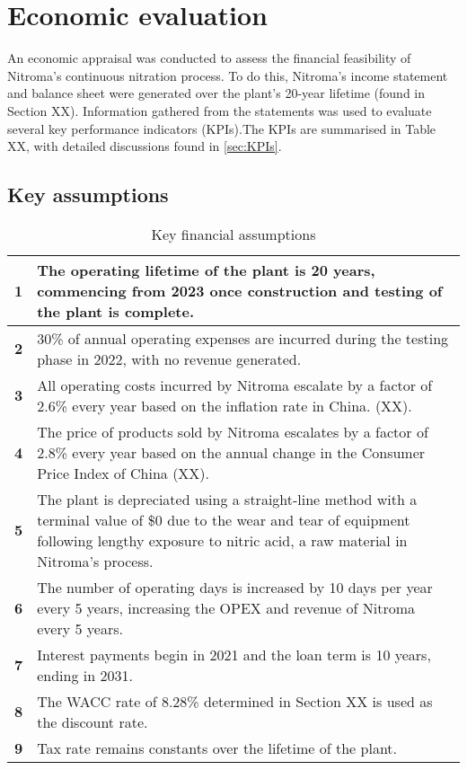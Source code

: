 \section{Economic evaluation}
An economic appraisal was conducted to assess the financial feasibility of Nitroma’s continuous nitration process. To do this, Nitroma’s income statement and balance sheet were generated over the plant’s 20-year lifetime (found in Section XX). Information gathered from the statements was used to evaluate several key performance indicators (KPIs).The KPIs are summarised in Table XX, with detailed discussions found in \cref{sec:KPIs}.

\subsection{Key assumptions}

 \begin{table}
    \vspace{-\intextsep}
    \centering
        \caption{Key financial assumptions}
        \label{tab:assumption}
    \begin{tabular}{@{}lp{15cm}@{}}
    \toprule
   \textbf{1} & The operating lifetime of the plant is 20 years, commencing from 2023 once construction and testing of the plant is complete.   \\ \midrule
   \textbf{2}      & 30\% of annual operating expenses are incurred during the testing phase in 2022, with no revenue generated.   \\
   \textbf{3}     & All operating costs incurred by Nitroma escalate by a factor of 2.6\% every year based on the inflation rate in China. (XX).   \\
   \textbf{4}                   & The price of products sold by Nitroma escalates by a factor of 2.8\% every year based on the annual change in the Consumer Price Index of China (XX).   \\
    \textbf{5}         & The plant is depreciated using a straight-line method with a terminal value of \$0 due to the wear and tear of equipment following lengthy exposure to nitric acid, a raw material in Nitroma's process.    \\ 
    \textbf{6} & The number of operating days is increased by 10 days per year every 5 years, increasing the OPEX and revenue of Nitroma every 5 years.\\
    \textbf{7} & Interest  payments begin in 2021 and the loan term is 10 years, ending in 2031. \\
    \textbf{8} & The WACC rate of 8.28\% determined in Section XX is used as the discount rate. \\
    \textbf{9} & Tax rate remains constants over the lifetime of the plant. \\
  \bottomrule
    \end{tabular}
    \end{table}

